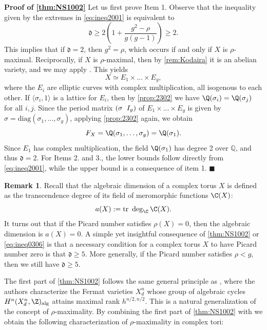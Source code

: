 \documentclass[11pt,leqno]{article}
\theoremstyle{definition}
\newtheorem{remark}{Remark}[section]
\begin{document}
\noindent\textbf{Proof of \cref{thm:NS1002}}
Let us first prove Item 1. Observe that the inequality given by the extremes in \cref{eq:ineq2001} is equivalent to
    \begin{equation}
    \label{eq:ineq0306}
   \mathfrak{d}\geq 2\left(1+\frac{g^2-\rho}{g(g-1)} \right)\geq 2.
   \end{equation}
This implies that if $\mathfrak{d}=2$, then $g^2=\rho$, which occurs if and only if $X$ is $\rho$-maximal. Reciprocally, if $X$ is $\rho$-maximal, then by \cref{rem:Kodaira}  it is an abelian variety, and we may apply \cite[Proposition 3]{beauville2014some}. This yields
$$X\simeq E_1\times\dots\times E_g,$$ 
where the $E_i$ are elliptic curves with complex multiplication, all isogenous to each other. If $\langle \sigma_i,1\rangle$ is a lattice for $E_i$, then by \cref{prop:2302} we have $\Q(\sigma_i)=\Q(\sigma_j)$ for all $i,j$. Since the period matrix $(\sigma\hspace{0.2cm}I_g)$ of $E_1\times\dots\times E_g$ is given by $\sigma=\mathrm{diag}(\sigma_1,\ldots,\sigma_g)$, applying \cref{prop:2302} again, we obtain
$$
F_X=\Q(\sigma_1,\ldots,\sigma_g)=\Q(\sigma_1).
$$
Since $E_1$ has complex multiplication, the field $\Q(\sigma_1)$ has degree 2 over $\mathbb{Q}$, and thus $\mathfrak{d}=2$. 
For Items 2. and 3., the lower bounds follow directly from \cref{eq:ineq2001}, while the upper bound is a consequence of item 1.
$\blacksquare$

\begin{remark}
Recall that the algebraic dimension of a complex torus $X$ is defined as the transcendence degree of its field of meromorphic functions $\C(X)$: 
   $$ 
   a(X):=\text{tr }\deg_{\C}\C(X).
   $$
   It turns out that if the Picard number satisfies $\rho(X)=0$, then the algebraic dimension is $a(X)=0$. A simple yet insightful consequence of \cref{thm:NS1002} or \cref{eq:ineq0306} 
   is that a necessary condition for a complex torus $X$ to have Picard number zero is that $\mathfrak{d}\geq 5.$ More generally, if the Picard number satisfies $\rho<g$, then we still have $\mathfrak{d}\geq 5.$ 
\end{remark}

The first part of \cref{thm:NS1002} follows the same general principle as \cite[Proposition 2.6]{duque2023fake}, where the authors characterize the Fermat varieties $X_d^n$ whose group of algebraic cycles $H^n(X_d^n,\Z)_{\text{alg}}$ attains maximal rank $h^{n/2,n/2}$. This is a natural generalization of the concept of $\rho$-maximality. By combining the first part of \cref{thm:NS1002} with \cite[Proposition 3]{beauville2014some}  we obtain the following characterization of $\rho$-maximality in complex tori:
\end{document}
